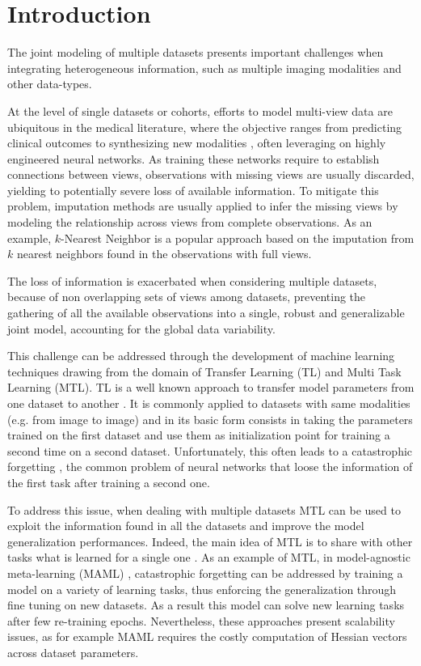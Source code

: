 \section{Introduction}

The joint modeling of multiple datasets presents important challenges when integrating heterogeneous information, such as multiple imaging modalities and other data-types.

At the level of single datasets or cohorts, efforts to model multi-view data are ubiquitous in the medical literature, where the objective ranges from predicting clinical outcomes \citep{Chen2019} to synthesizing new modalities \citep{Zhou2020, Wei2019}, often leveraging on highly engineered neural networks.
As training these networks require to establish connections between views, observations with missing views are usually discarded, yielding to potentially  severe loss of available information.
To mitigate this problem, imputation methods are usually applied to infer the missing views by modeling the relationship across views from complete observations.
As an example, $k$-Nearest Neighbor is a popular approach based on the imputation from $k$ nearest neighbors found in the observations with full views.

The loss of information is exacerbated when considering multiple datasets, because of non overlapping sets of views among datasets, preventing the gathering of all the available observations into a single, robust and generalizable joint model, accounting for the global data variability.

This challenge can be addressed through the development of machine learning techniques drawing from the domain of Transfer Learning (TL) and Multi Task Learning (MTL).
TL is a well known approach to transfer model parameters from one dataset to another \citep{TL}.
It is commonly applied to datasets with same modalities (e.g. from image to image) and in its basic form consists in taking the parameters trained on the first dataset and use them as initialization point for training a second time on a second dataset.
Unfortunately, this often leads to a catastrophic forgetting \citep{CatastroficForgetting}, the common problem of neural networks that loose the information of the first task after training a second one.

To address this issue, when dealing with multiple datasets MTL can be used to exploit the information found in all the datasets and improve the model generalization performances.
Indeed, the main idea of MTL is to share with other tasks what is learned for a single one \citep{Caruana1998, Dorado-Moreno2020}.
As an example of MTL, in model-agnostic meta-learning (MAML) \citep{MAML1}, catastrophic forgetting can be addressed by training a model on a variety of learning tasks, thus enforcing the generalization through fine tuning on new datasets.
As a result this model can solve new learning tasks after few re-training epochs.
Nevertheless, these approaches present scalability issues, as for example MAML requires the costly computation of Hessian vectors across dataset parameters.

